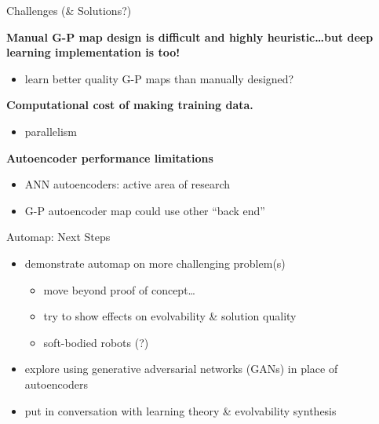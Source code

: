 \begin{frame}{Challenges (\& Solutions?)}

\textbf{Manual G-P map design is difficult and highly heuristic\dots but deep
learning implementation is too!}
\pause
\vspace{-1ex}
\begin{itemize}[<+->]
\itemsep0em
\item learn better quality G-P maps than manually designed?
\end{itemize}
\vspace{-1ex}
\pause


\textbf{Computational cost of making training data.}
\pause
\vspace{-1ex}
\begin{itemize}[<+->]
\itemsep0em
\item parallelism
\end{itemize}
\vspace{-1ex}
\pause


\textbf{Autoencoder performance limitations}
\pause
\vspace{-1ex}
\begin{itemize}[<+->]
\itemsep0em
\item ANN autoencoders: active area of research
\item G-P autoencoder map could use other ``back end''
\end{itemize}

\end{frame}

\begin{frame}{Automap: Next Steps}

\begin{itemize}[<+->]
\item demonstrate automap on more challenging problem(s)
\begin{itemize}
\item move beyond proof of concept\dots
\item try to show effects on evolvability \& solution quality
\item soft-bodied robots (?)
\end{itemize}
\item explore using generative adversarial networks (GANs) in place of autoencoders
\item put in conversation with learning theory \& evolvability synthesis \cite{kouvaris2017evolution}
\end{itemize}

\end{frame}
